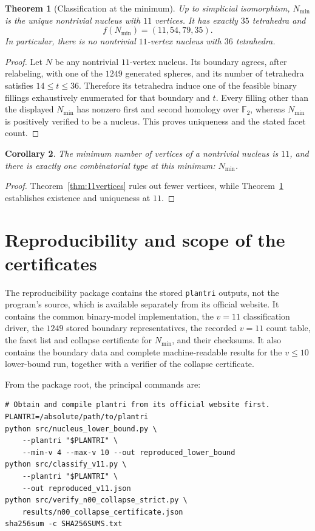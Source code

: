 \documentclass[11pt]{article}
\newtheorem{theorem}{Theorem}
\newtheorem{corollary}[theorem]{Corollary}
\begin{document}
\begin{theorem}[Classification at the minimum]\label{thm:unique11}
Up to simplicial isomorphism, $N_{\min}$ is the unique nontrivial nucleus
with $11$ vertices.  It has exactly $35$ tetrahedra and
\[
 f(N_{\min})=(11,54,79,35).
\]
In particular, there is no nontrivial $11$-vertex nucleus with $36$
tetrahedra.
\end{theorem}

\begin{proof}
Let $N$ be any nontrivial $11$-vertex nucleus.  Its boundary agrees,
after relabeling, with one of the $1249$ generated spheres, and its
number of tetrahedra satisfies $14\le t\le36$.  Therefore its tetrahedra
induce one of the feasible binary fillings exhaustively enumerated for
that boundary and $t$.  Every filling other than the displayed $N_{\min}$
has nonzero first and second homology over $\mathbb F_2$, whereas
$N_{\min}$ is positively verified to be a nucleus.  This proves uniqueness
and the stated facet count.
\end{proof}

\begin{corollary}\label{cor:smallest}
The minimum number of vertices of a nontrivial nucleus is $11$, and
there is exactly one combinatorial type at this minimum: $N_{\min}$.
\end{corollary}

\begin{proof}
Theorem~\ref{thm:11vertices} rules out fewer vertices, while
Theorem~\ref{thm:unique11} establishes existence and uniqueness at $11$.
\end{proof}

\section{Reproducibility and scope of the certificates}

The reproducibility package contains the stored \texttt{plantri} outputs,
not the program's source, which is available separately from its official
website. It contains the common binary-model implementation, the $v=11$ classification driver,
the $1249$ stored boundary representatives, the recorded $v=11$ count table,
the facet list and collapse certificate for $N_{\min}$, and their checksums.
It also contains the boundary data and complete
machine-readable results for the $v\le10$ lower-bound run, together with a
verifier of the collapse certificate.

From the package root, the principal commands are:
\begin{verbatim}
# Obtain and compile plantri from its official website first.
PLANTRI=/absolute/path/to/plantri
python src/nucleus_lower_bound.py \
    --plantri "$PLANTRI" \
    --min-v 4 --max-v 10 --out reproduced_lower_bound
python src/classify_v11.py \
    --plantri "$PLANTRI" \
    --out reproduced_v11.json
python src/verify_n00_collapse_strict.py \
    results/n00_collapse_certificate.json
sha256sum -c SHA256SUMS.txt
\end{verbatim}
\end{document}
